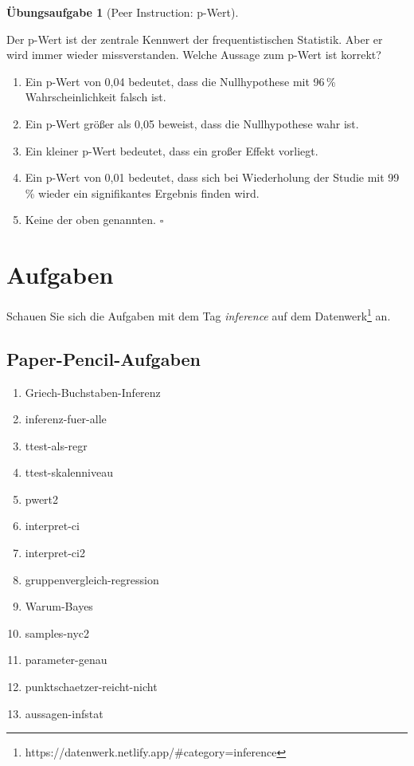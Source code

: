 \documentclass[
  ngerman,
  letterpaper,
  twoside,
  open=any]{scrbook}
\providecommand{\tightlist}{%
  \setlength{\itemsep}{0pt}\setlength{\parskip}{0pt}}\usepackage{longtable,booktabs,array}
\theoremstyle{definition}
\theoremstyle{plain}
\theoremstyle{definition}
\newtheorem{exercise}{Übungsaufgabe}[chapter]
\theoremstyle{definition}
\theoremstyle{definition}
\theoremstyle{definition}
\newtheorem{exercise}{Übungsaufgabe}[chapter]
\theoremstyle{remark}
\begin{document}
\begin{exercise}[Peer Instruction:
p-Wert]\protect\hypertarget{exr-pwert}{}\label{exr-pwert}

Der p-Wert ist der zentrale Kennwert der frequentistischen Statistik.
Aber er wird immer wieder missverstanden. Welche Aussage zum p-Wert ist
korrekt?

\begin{enumerate}
\def\labelenumi{\Alph{enumi})}
\tightlist
\item
  Ein p-Wert von 0,04 bedeutet, dass die Nullhypothese mit 96\,\%
  Wahrscheinlichkeit falsch ist.
\item
  Ein p-Wert größer als 0,05 beweist, dass die Nullhypothese wahr ist.
\item
  Ein kleiner p-Wert bedeutet, dass ein großer Effekt vorliegt.
\item
  Ein p-Wert von 0,01 bedeutet, dass sich bei Wiederholung der Studie
  mit 99\,\% wieder ein signifikantes Ergebnis finden wird.
\item
  Keine der oben genannten. \(\square\)
\end{enumerate}

\end{exercise}

\section{Aufgaben}\label{aufgaben-1}

Schauen Sie sich die Aufgaben mit dem Tag \emph{inference} auf dem
Datenwerk\footnote{https://datenwerk.netlify.app/\#category=inference}
an.

\subsection{Paper-Pencil-Aufgaben}\label{paper-pencil-aufgaben}

\begin{enumerate}
\def\labelenumi{\arabic{enumi}.}
\tightlist
\item
  Griech-Buchstaben-Inferenz
\item
  inferenz-fuer-alle
\item
  ttest-als-regr
\item
  ttest-skalenniveau
\item
  pwert2
\item
  interpret-ci
\item
  interpret-ci2
\item
  gruppenvergleich-regression
\item
  Warum-Bayes
\item
  samples-nyc2
\item
  parameter-genau
\item
  punktschaetzer-reicht-nicht
\item
  aussagen-infstat
\end{enumerate}
\end{document}
